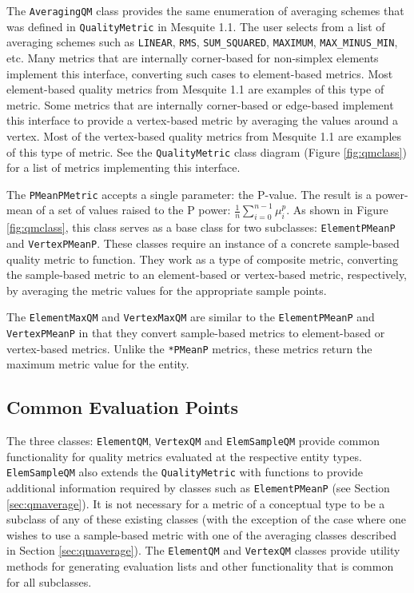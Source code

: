 \documentclass{article}
\begin{document}
The \texttt{AveragingQM} class provides the same enumeration of averaging schemes that was defined in \texttt{QualityMetric} in Mesquite 1.1.  The user selects from a list of averaging schemes such as \texttt{LINEAR}, \texttt{RMS}, \texttt{SUM\_SQUARED}, \texttt{MAXIMUM}, \texttt{MAX\_MINUS\_MIN}, etc.  Many metrics that are internally corner-based for non-simplex elements implement this interface, converting such cases to element-based metrics.  Most element-based quality metrics from Mesquite 1.1 are examples of this type of metric.  Some metrics that are internally corner-based or edge-based implement this interface to provide a vertex-based metric by averaging the values around a vertex.  Most of the vertex-based quality metrics from Mesquite 1.1 are examples of this type of metric.  See the \texttt{QualityMetric} class diagram (Figure \ref{fig:qmclass}) for a list of metrics implementing this interface.

The \texttt{PMeanPMetric} accepts a single parameter: the P-value.  The result is a power-mean of a set of values raised to the P power: $\frac{1}{n}\sum_{i=0}^{n-1}\mu_i^p$.  As shown in Figure \ref{fig:qmclass}, this class serves as a base class for two subclasses: \texttt{ElementPMeanP} and \texttt{VertexPMeanP}.  These classes require an instance of a concrete sample-based quality metric to function.  They work as a type of composite metric, converting the sample-based metric to an element-based or vertex-based metric, respectively, by averaging the metric values for the appropriate sample points. 

The \texttt{ElementMaxQM} and \texttt{VertexMaxQM} are similar to the \texttt{ElementPMeanP} and \texttt{VertexPMeanP} in that they convert sample-based metrics to element-based or vertex-based metrics.  Unlike the \texttt{*PMeanP} metrics, these metrics return the maximum metric value for the entity.  

\subsection{Common Evaluation Points}

The three classes: \texttt{ElementQM}, \texttt{VertexQM} and \texttt{ElemSampleQM} provide common functionality for quality metrics evaluated at the respective entity types.  \texttt{ElemSampleQM} also extends the \texttt{QualityMetric} with functions to provide additional information required by classes such as \texttt{ElementPMeanP} (see Section \ref{sec:qmaverage}).  It is not necessary for a metric of a conceptual type to be a subclass of any of these existing classes (with the exception of the case where one wishes to use a sample-based metric with one of the averaging classes described in Section \ref{sec:qmaverage}).  The \texttt{ElementQM} and \texttt{VertexQM} classes provide utility methods for generating evaluation lists and other functionality that is common for all subclasses.
\end{document}
